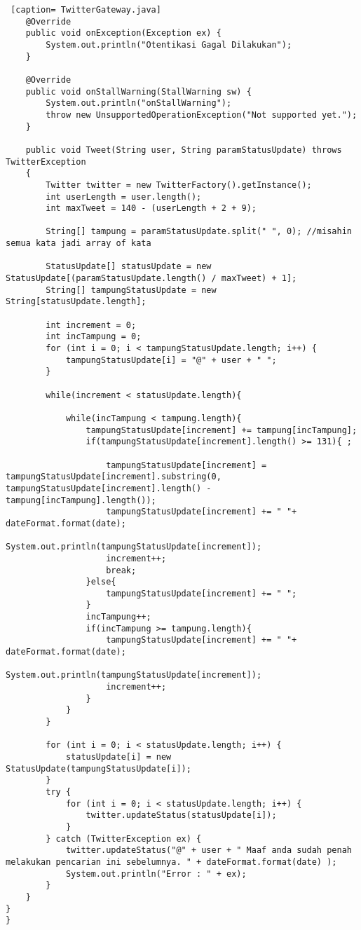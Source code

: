 \begin{lstlisting} [caption= TwitterGateway.java]
    @Override
    public void onException(Exception ex) {
        System.out.println("Otentikasi Gagal Dilakukan");
    }

    @Override
    public void onStallWarning(StallWarning sw) {
        System.out.println("onStallWarning");
        throw new UnsupportedOperationException("Not supported yet.");
    }
    
    public void Tweet(String user, String paramStatusUpdate) throws TwitterException
    {
        Twitter twitter = new TwitterFactory().getInstance();
        int userLength = user.length();
        int maxTweet = 140 - (userLength + 2 + 9);
        
        String[] tampung = paramStatusUpdate.split(" ", 0); //misahin semua kata jadi array of kata
        
        StatusUpdate[] statusUpdate = new StatusUpdate[(paramStatusUpdate.length() / maxTweet) + 1];
        String[] tampungStatusUpdate = new String[statusUpdate.length];
        
        int increment = 0;
        int incTampung = 0;
        for (int i = 0; i < tampungStatusUpdate.length; i++) {
            tampungStatusUpdate[i] = "@" + user + " ";
        }
        
        while(increment < statusUpdate.length){
            
            while(incTampung < tampung.length){
                tampungStatusUpdate[increment] += tampung[incTampung]; 
                if(tampungStatusUpdate[increment].length() >= 131){ ;
                    
                    tampungStatusUpdate[increment] = tampungStatusUpdate[increment].substring(0, tampungStatusUpdate[increment].length() - tampung[incTampung].length());
                    tampungStatusUpdate[increment] += " "+ dateFormat.format(date);
                    System.out.println(tampungStatusUpdate[increment]);
                    increment++;
                    break;
                }else{
                    tampungStatusUpdate[increment] += " ";
                }
                incTampung++;
                if(incTampung >= tampung.length){
                    tampungStatusUpdate[increment] += " "+ dateFormat.format(date);
                    System.out.println(tampungStatusUpdate[increment]);
                    increment++;
                }
            }
        }
        
        for (int i = 0; i < statusUpdate.length; i++) {
            statusUpdate[i] = new StatusUpdate(tampungStatusUpdate[i]);
        }
        try {
            for (int i = 0; i < statusUpdate.length; i++) {
                twitter.updateStatus(statusUpdate[i]);
            }
        } catch (TwitterException ex) {
            twitter.updateStatus("@" + user + " Maaf anda sudah penah melakukan pencarian ini sebelumnya. " + dateFormat.format(date) );
            System.out.println("Error : " + ex);
        }
    }
}
}
\end{lstlisting}